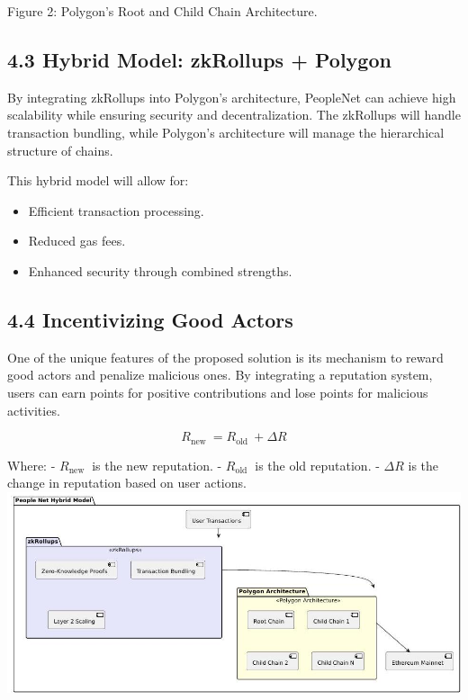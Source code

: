 \documentclass[10pt]{article}
\begin{document}
Figure 2: Polygon's Root and Child Chain Architecture.

\subsection*{4.3 Hybrid Model: zkRollups + Polygon}
By integrating zkRollups into Polygon's architecture, PeopleNet can achieve high scalability while ensuring security and decentralization. The zkRollups will handle transaction bundling, while Polygon's architecture will manage the hierarchical structure of chains.

This hybrid model will allow for:

\begin{itemize}
  \item Efficient transaction processing.
  \item Reduced gas fees.
  \item Enhanced security through combined strengths.
\end{itemize}

\subsection*{4.4 Incentivizing Good Actors}
One of the unique features of the proposed solution is its mechanism to reward good actors and penalize malicious ones. By integrating a reputation system, users can earn points for positive contributions and lose points for malicious activities.


\begin{equation*}
R_{\text {new }}=R_{\text {old }}+\Delta R \tag{2}
\end{equation*}


Where: - $R_{\text {new }}$ is the new reputation. - $R_{\text {old }}$ is the old reputation. - $\Delta R$ is the change in reputation based on user actions.\\
\includegraphics[max width=\textwidth, center]{2025_03_06_545dea0014012947d15fg-04}
\end{document}
